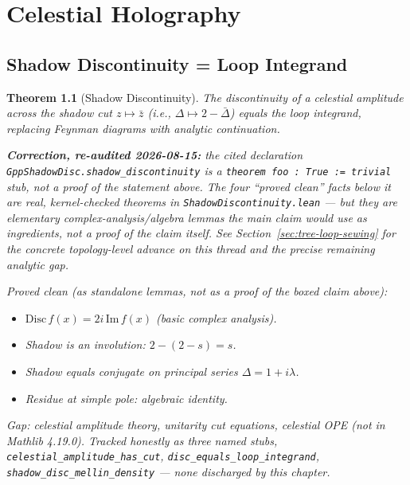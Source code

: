 \documentclass{report}
\newtheorem{theorem}{Theorem}[chapter]
\theoremstyle{definition}
\begin{document}
\chapter{Celestial Holography}

\section{Shadow Discontinuity = Loop Integrand}

\begin{theorem}[Shadow Discontinuity]
  \label{thm:shadow-discontinuity}
  The discontinuity of a celestial amplitude across the shadow cut
  $z \mapsto \bar{z}$ (i.e., $\Delta \mapsto 2-\bar\Delta$) equals the loop integrand,
  replacing Feynman diagrams with analytic continuation.

  \textbf{Correction, re-audited 2026-08-15:} the cited declaration
  \texttt{GppShadowDisc.shadow\_discontinuity} is a \texttt{theorem foo : True := trivial}
  stub, not a proof of the statement above. The four ``proved clean'' facts below it
  \emph{are} real, kernel-checked theorems in \texttt{ShadowDiscontinuity.lean} --- but
  they are elementary complex-analysis/algebra lemmas the main claim would use as
  ingredients, not a proof of the claim itself. See
  Section~\ref{sec:tree-loop-sewing} for the concrete topology-level advance on this
  thread and the precise remaining analytic gap.

  \emph{Proved clean (as standalone lemmas, not as a proof of the boxed claim above):}
  \begin{itemize}
    \item $\mathrm{Disc}\,f(x) = 2i\,\mathrm{Im}\,f(x)$ (basic complex analysis).
    \item Shadow is an involution: $2-(2-s)=s$.
    \item Shadow equals conjugate on principal series $\Delta = 1+i\lambda$.
    \item Residue at simple pole: algebraic identity.
  \end{itemize}

  \emph{Gap:} celestial amplitude theory, unitarity cut equations, celestial OPE
  (not in Mathlib 4.19.0). Tracked honestly as three named stubs,
  \texttt{celestial\_amplitude\_has\_cut}, \texttt{disc\_equals\_loop\_integrand},
  \texttt{shadow\_disc\_mellin\_density} --- none discharged by this chapter.
\end{theorem}
\end{document}
